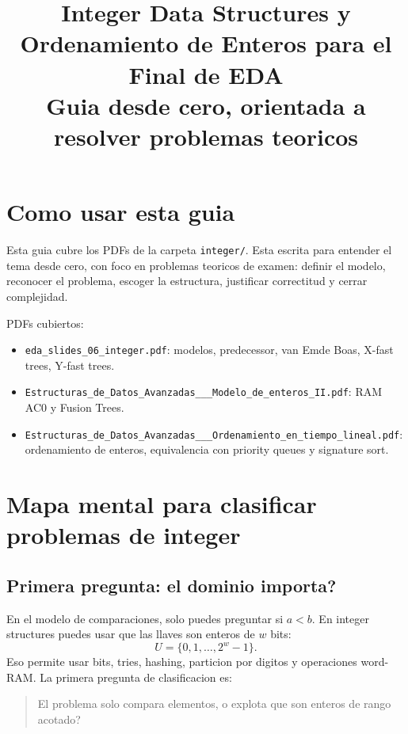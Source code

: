 \documentclass[10pt]{article}
\title{Integer Data Structures y Ordenamiento de Enteros para el Final de EDA\\
\large Guia desde cero, orientada a resolver problemas teoricos}
\author{}
\date{}
\begin{document}
\sloppy
\maketitle

\section*{Como usar esta guia}
Esta guia cubre los PDFs de la carpeta \texttt{integer/}. Esta escrita para
entender el tema desde cero, con foco en problemas teoricos de examen: definir
el modelo, reconocer el problema, escoger la estructura, justificar correctitud
y cerrar complejidad.

PDFs cubiertos:
\begin{itemize}[leftmargin=*]
\item \texttt{eda\_slides\_06\_integer.pdf}: modelos, predecessor, van Emde
Boas, X-fast trees, Y-fast trees.
\item \texttt{Estructuras\_de\_Datos\_Avanzadas\_\_\_Modelo\_de\_enteros\_II.pdf}:
RAM AC0 y Fusion Trees.
\item \texttt{Estructuras\_de\_Datos\_Avanzadas\_\_\_Ordenamiento\_en\_tiempo\_lineal.pdf}:
ordenamiento de enteros, equivalencia con priority queues y signature sort.
\end{itemize}

\tableofcontents
\newpage

\section{Mapa mental para clasificar problemas de integer}

\subsection{Primera pregunta: el dominio importa?}
En el modelo de comparaciones, solo puedes preguntar si $a<b$. En integer
structures puedes usar que las llaves son enteros de $w$ bits:
\[
U=\{0,1,\ldots,2^w-1\}.
\]
Eso permite usar bits, tries, hashing, particion por digitos y operaciones
word-RAM. La primera pregunta de clasificacion es:
\begin{quote}
El problema solo compara elementos, o explota que son enteros de rango acotado?
\end{quote}
\end{document}
